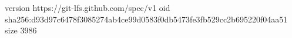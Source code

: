 version https://git-lfs.github.com/spec/v1
oid sha256:d93d97c6478f3085274ab4ce99d0583f0db5473fe3fb529cc2b695220f04aa51
size 3986
